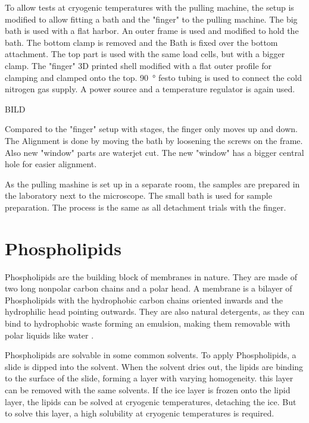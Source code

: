 To allow tests at cryogenic temperatures with the pulling machine, the setup is modified to allow fitting a bath and the "finger" to the pulling machine. The big bath is used with a flat harbor. An outer frame is used and modified to hold the bath. The bottom clamp is removed and the Bath is fixed over the bottom attachment. The top part is used with the same load cells, but with a bigger clamp. The "finger" 3D printed shell modified with a flat outer profile for clamping and clamped onto the top. \SI{90}{\degree} festo tubing is used to connect the cold nitrogen gas supply. A power source and a temperature regulator is again used. 

BILD

Compared to the "finger" setup with stages, the finger only moves up and down. The Alignment is done by moving the bath by loosening the screws on the frame. Also new "window" parts are waterjet cut. The new "window" has a bigger central hole for easier alignment.

As the pulling mashine is set up in a separate room, the samples are prepared in the laboratory next to the microscope. The small bath is used for sample preparation. The process is the same as all detachment trials with the finger. 

\section{Phospholipids}
\label{section:metodeLipide}

Phospholipids are the building block of membranes in nature. They are made of two long nonpolar carbon chains and a polar head. A membrane is a bilayer of Phospholipids with the hydrophobic carbon chains oriented inwards and the hydrophilic head pointing outwards. They are also natural detergents, as they can bind to hydrophobic waste forming an emulsion, making them removable with polar liquids like water \cite{SriramaM.BhairiPh.D..2001}.

Phospholipids are solvable in some common solvents. To apply Phospholipids, a slide is dipped into the solvent. When the solvent dries out, the lipids are binding to the surface of the slide, forming a layer with varying homogeneity. this layer can be removed with the same solvents. If the ice layer is frozen onto the lipid layer, the lipids can be solved at cryogenic temperatures, detaching the ice. But to solve this layer, a high solubility at cryogenic temperatures is required. 


